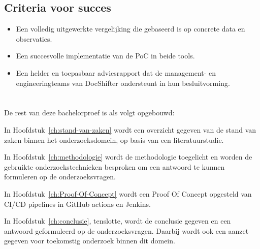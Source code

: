 \subsection*{Criteria voor succes}
\begin{itemize}
    \item Een volledig uitgewerkte vergelijking die gebaseerd is op concrete data en observaties.
    \item Een succesvolle implementatie van de PoC in beide tools.
    \item Een helder en toepasbaar adviesrapport dat de management- en engineeringteams van DocShifter ondersteunt in hun besluitvorming.
\end{itemize}

\section{}%
\label{sec:opzet-bachelorproef}


De rest van deze bachelorproef is als volgt opgebouwd:

In Hoofdstuk~\ref{ch:stand-van-zaken} wordt een overzicht gegeven van de stand van zaken binnen het onderzoeksdomein, op basis van een literatuurstudie.

In Hoofdstuk~\ref{ch:methodologie} wordt de methodologie toegelicht en worden de gebruikte onderzoekstechnieken besproken om een antwoord te kunnen formuleren op de onderzoeksvragen.

In Hoofdstuk~\ref{ch:Proof-Of-Concept} wordt een Proof Of Concept opgesteld van CI/CD pipelines in GitHub actions en Jenkins.

In Hoofdstuk~\ref{ch:conclusie}, tenslotte, wordt de conclusie gegeven en een antwoord geformuleerd op de onderzoeksvragen. Daarbij wordt ook een aanzet gegeven voor toekomstig onderzoek binnen dit domein.